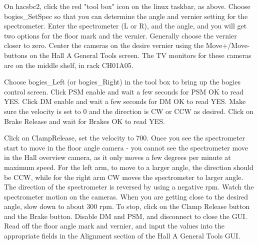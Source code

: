 {On hacsbc2, click the red "tool box" icon on the linux taskbar, as above. Choose 
bogies\_SetSpec so that you can determine the angle and vernier setting for the spectrometer.
Enter the spectrometer (L or R), and the angle, and you will get two options for the floor 
mark and the vernier. Generally choose the vernier closer to zero. Center the cameras on the 
desire vernier using the Move+/Move- buttons on the Hall A General Tools screen. The TV monitors 
for these cameras are on the middle shelf, in rack CH01A05.

Choose bogies\_Left (or bogies\_Right) in the tool box to bring up the bogies control screen. 
Click PSM enable and wait a few seconds for PSM OK to read YES. 
Click DM enable and wait a few seconds for DM OK to read YES.
Make sure the velocity is set to 0 and the direction is CW or CCW as desired. Click on Brake Release 
and wait for Brakes OK to read YES.

Click on ClampRelease, set the velocity to 700. Once you see the spectrometer start to move in the 
floor angle camera - you cannot see the spectrometer move in the Hall overview camera, as it only 
moves a few degrees per minute at maximum speed. For the left arm, to move to a larger angle, the 
direction should be CCW, while for the right arm CW moves the spectrometer to larger angle. The 
direction of the spectrometer is reversed by using a negative rpm. Watch the spectrometer motion 
on the cameras. When you are getting close to the desired angle, slow down to about 300 rpm. 
To stop, click on the Clamp Release button and the Brake button. Disable DM and PSM, and disconnect 
to close the GUI. Read off the floor angle mark and vernier, and input the values into the appropriate 
fields in the Alignment section of the Hall A General Tools GUI. 
}








